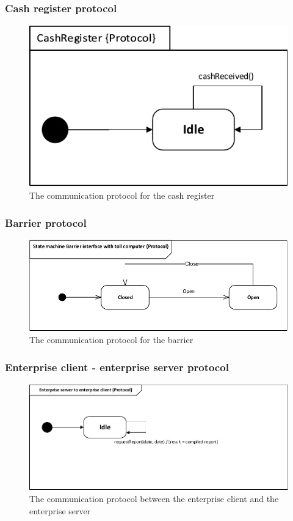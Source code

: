 \subsubsection*{Cash register protocol}
\begin{figure}[H]
\centering
\includegraphics[width=0.7\linewidth]{img/behaviour_state_machines/protocol_state_machines/protocol_state_machine_CR_TLC}
\caption{The communication protocol for the cash register}
\label{fig:protocol_state_machine_CR_TLC}
\end{figure}

\subsubsection*{Barrier protocol}
\begin{figure}[H]
\centering
\includegraphics[width=0.7\linewidth]{img/behaviour_state_machines/protocol_state_machines/protocol_state_machine_barrier}
\caption{The communication protocol for the barrier}
\label{fig:protocol_state_machine_barrier}
\end{figure}

\subsubsection*{Enterprise client - enterprise server protocol}
\begin{figure}[H]
\centering
\includegraphics[width=0.7\linewidth]{img/behaviour_state_machines/protocol_state_machines/protocol_state_machine_enterprise_server_to_enterprise_client}
\caption{The communication protocol between the enterprise client and the enterprise server}
\label{fig:protocol_state_machine_enterprise_server_to_enterprise_client}
\end{figure}

